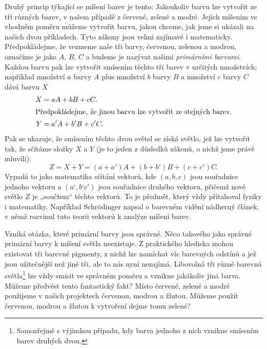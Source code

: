     Druhý princip týkající se míšení barev je tento: Jakoukoliv barvu lze vytvořit ze tří různých 
    barev, v našem případě z červené, zelené a modré. Jejich míšením ve vhodném poměru můžeme 
    vytvořit barvu, jakou chceme, jak jsme si ukázali na našich dvou příkladech. Tyto zákony jsou 
    velmi zajímavé i matematicky. Předpokládejme, že vezmeme naše tři barvy, červenou, zelenou a 
    modrou, označíme je jako \(A\), \(B\), \(C\) a budeme je nazývat našimi \emph{primárními 
    barvami}. Každou barvu pak lze vytvořit smísením těchto tří barev v určitých množstvích; 
    například množství \(a\) barvy \(A\) plus množství \(b\) barvy \(B\) a množství \(c\) barvy 
    \(C\) dává barvu \(X\)
    \begin{align}
      X &= aA + bB + cC.     \label{FYZ:eq231}     \\
      \shortintertext{Předpokládejme, že jinou barvu lze vytvořit ze stejných barev.}
      Y &= a'A + b'B + c'C.  \label{FYZ:eq232}
    \end{align}
    Pak se ukazuje, že smísením těchto dvou světel se získá světlo, jež lze vytvořit tak, že 
    sčítáme složky \(X\) a \(Y\) (je to jeden z důsledků zákonů, o nichž jsme právě mluvili):
    \begin{equation}\label{FYZ:eq233}
      Z = X + Y = (a+a')A + (b+b')B + (c+c')C.
    \end{equation}
    Vypadá to jako matematika sčítání vektorů, kde \((a, b, c)\) jsou souřadnice jednoho vektoru a 
    \((a‘, b‘ c')\) jsou souřadnice druhého vektoru, přičemž nové světlo \(Z\) je „součtem“ těchto 
    vektorů. To je předmět, který vždy přitahoval fyziky i matematiky. Například Schr{\"o}dinger 
    napsal o barevném vidění nádherný článek, v němž rozvinul tuto teorii vektorů k analýze míšení 
    barev.
    
    Vzniká otázka, které primární barvy jsou správné. Něco takového jako správné primární barvy k 
    míšení světla neexistuje. Z praktického hlediska mohou existovat tři barevné pigmenty, z nichž 
    lze namíchat víc barevných odstínů a jež jsou užitečnější než jiné tři, ale to nás nyní 
    nezajímá. Libovolná tři různě barevná světla\footnote{ Samozřejmě s výjimkou případu, kdy barva 
    jednoho z nich vznikne smísením barev druhých dvou. } lze vždy smísit ve správném poměru a 
    vznikne jakákoliv jiná barva. Můžeme předvést tento fantastický fakt? Místo červené, zelené a 
    modré použijeme v našich projektech červenou, modrou a žlutou. Můžeme použít červenou, modrou a 
    žlutou k vytvoření dejme tomu zelené?
    
